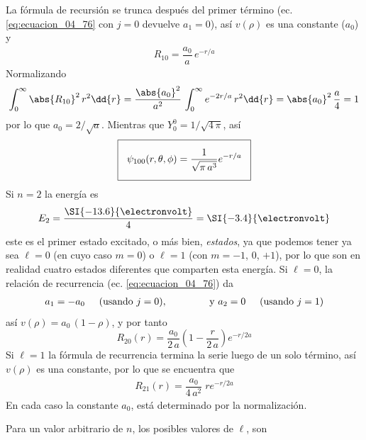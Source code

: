 La fórmula de recursión se trunca después del primer término (ec. \ref{eq:ecuacion_04_76} con $j=0$ devuelve $a_{1} = 0$), así $v(\rho)$ es una constante ($a_{0}$) y
\begin{align}
R_{10} = \dfrac{a_{0}}{a} \, e^{-r/a}
\label{eq:ecuacion_04_79}
\end{align}
Normalizando
\begin{align*}
\int_{0}^{\infty} \abs{R_{10}}^{2} \, r^{2} \dd{r} = \dfrac{\abs{a_{0}}^{2}}{a^{2}} \, \int_{0}^{\infty} e^{-2r/a} \, r^{2} \dd{r} =  \abs{a_{0}}^{2} \, \dfrac{a}{4} =  1
\end{align*}
por lo que $a_{0} = 2 / \sqrt{a}$. Mientras que $Y_{0}^{0} = 1 / \sqrt{4 \, \pi}$, así
\begin{align}
\setlength{\fboxsep}{3\fboxsep}\boxed{
\psi_{100} (r, \theta, \phi) = \dfrac{1}{\sqrt{\pi \, a^{3}}} e^{-r/a}}
\label{eq:ecuacion_04_80}
\end{align}
Si $n = 2$ la energía es
\begin{align}
E_{2} = \dfrac{\SI{-13.6}{\electronvolt}}{4} =  \SI{- 3.4}{\electronvolt}
\label{eq:ecuacion_04_81}
\end{align}
este es el primer estado excitado, o más bien, \textit{estados}, ya que podemos tener ya sea $\ell = 0$ (en cuyo caso $m = 0$) o $\ell = 1$ (con $m = -1$, $0$, $+ 1$), por lo que son en realidad cuatro estados diferentes que comparten esta energía. Si $\ell = 0$, la relación de recurrencia (ec. \ref{eq:ecuacion_04_76}) da
\begin{align*}
a_{1} = - a_{0} \hspace{0.5cm} \text{(usando } j = 0 \text{)}, \hspace{1.5cm} \text{y } a_{2} = 0 \hspace{0.5cm} \text{(usando } j = 1 \text{)}
\end{align*}
así $v(\rho) = a_{0} \, (1 - \rho)$, y por tanto
\begin{equation}
R_{20}(r) = \dfrac{a_{0}}{2 \, a} \left(1 - \dfrac{r}{2 \, a} \right) e^{-r/2a}
\label{eq:ecuacion_04_82}
\end{equation}
Si $\ell = 1$ la fórmula de recurrencia termina la serie luego de un solo término, así $v(\rho)$ es una constante, por lo que se encuentra que
\begin{align}
R_{21}(r) = \dfrac{a_{0}}{4 \, a^{2}} \; r e^{-r/2a}
\label{eq:ecuacion_04_83}
\end{align}
En cada caso la constante $a_{0}$, está determinado por la normalización.
\par
Para un valor arbitrario de $n$, los posibles valores de $\ell$, son
